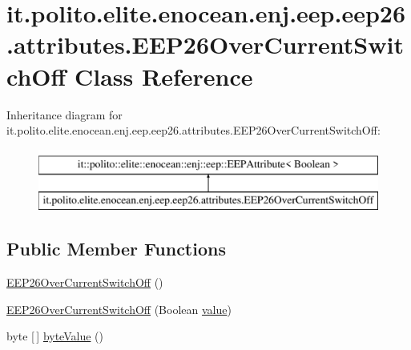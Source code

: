 \hypertarget{classit_1_1polito_1_1elite_1_1enocean_1_1enj_1_1eep_1_1eep26_1_1attributes_1_1_e_e_p26_over_current_switch_off}{}\section{it.\+polito.\+elite.\+enocean.\+enj.\+eep.\+eep26.\+attributes.\+E\+E\+P26\+Over\+Current\+Switch\+Off Class Reference}
\label{classit_1_1polito_1_1elite_1_1enocean_1_1enj_1_1eep_1_1eep26_1_1attributes_1_1_e_e_p26_over_current_switch_off}
Inheritance diagram for it.\+polito.\+elite.\+enocean.\+enj.\+eep.\+eep26.\+attributes.\+E\+E\+P26\+Over\+Current\+Switch\+Off\+:\begin{figure}[H]
\begin{center}
\leavevmode
\includegraphics[height=2.000000cm]{classit_1_1polito_1_1elite_1_1enocean_1_1enj_1_1eep_1_1eep26_1_1attributes_1_1_e_e_p26_over_current_switch_off}
\end{center}
\end{figure}
\subsection*{Public Member Functions}
\begin{DoxyCompactItemize}
\item 
\hyperlink{classit_1_1polito_1_1elite_1_1enocean_1_1enj_1_1eep_1_1eep26_1_1attributes_1_1_e_e_p26_over_current_switch_off_ada95f5b37589ed1fcc95b32c712d72ad}{E\+E\+P26\+Over\+Current\+Switch\+Off} ()
\item 
\hyperlink{classit_1_1polito_1_1elite_1_1enocean_1_1enj_1_1eep_1_1eep26_1_1attributes_1_1_e_e_p26_over_current_switch_off_ae4740fc492d02b1c78d9e225986dcf84}{E\+E\+P26\+Over\+Current\+Switch\+Off} (Boolean \hyperlink{classit_1_1polito_1_1elite_1_1enocean_1_1enj_1_1eep_1_1_e_e_p_attribute_af4d7e34642004bb6ccfae51e925c983d}{value})
\item 
byte \mbox{[}$\,$\mbox{]} \hyperlink{classit_1_1polito_1_1elite_1_1enocean_1_1enj_1_1eep_1_1eep26_1_1attributes_1_1_e_e_p26_over_current_switch_off_a462b7ce77172c4cb63a95904a92eebe9}{byte\+Value} ()
\end{DoxyCompactItemize}

